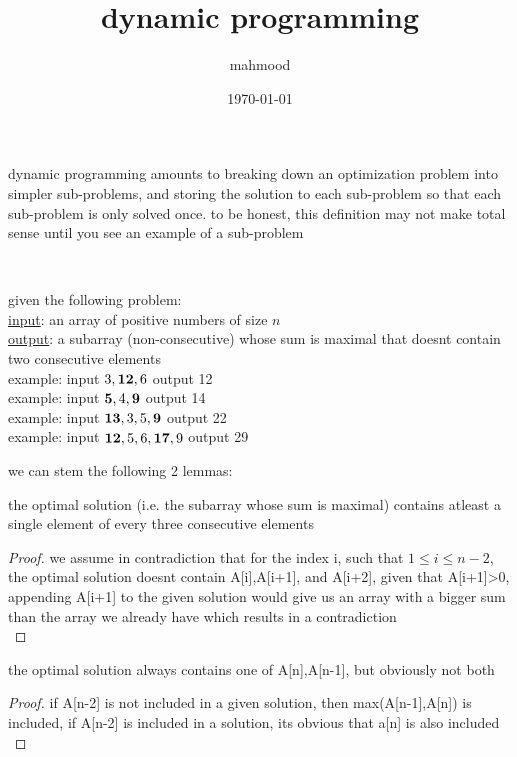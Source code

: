 \documentclass[a4paper,12pt]{article}
\author{mahmood}
\date{\today}
\title{dynamic programming}
\begin{document}
\maketitle
\begin{definition}
dynamic programming amounts to breaking down an optimization problem into simpler sub-problems, and storing the solution to each sub-problem so that each sub-problem is only solved once. to be honest, this definition may not make total sense until you see an example of a sub-problem\\[0pt]
\end{definition}
\\[0pt]
\begin{question}
given the following problem:\\[0pt]
\uline{input}: an array of positive numbers of size \(n\)\\[0pt]
\uline{output}: a subarray (non-consecutive) whose sum is maximal that doesnt contain two consecutive elements\\[0pt]
example: input \(3,{\bf 12},6\) output 12\\[0pt]
example: input \({\bf 5},4,{\bf 9}\) output 14\\[0pt]
example: input \({\bf 13},3,5,{\bf 9}\) output 22\\[0pt]
example: input \({\bf 12},5,6,{\bf 17},9\) output 29\\[0pt]
\begin{answer}
we can stem the following 2 lemmas:\\[0pt]
\begin{lemma}
the optimal solution (i.e. the subarray whose sum is maximal) contains atleast a single element of every three consecutive elements\\[0pt]
\begin{proof}
we assume in contradiction that for the index i, such that \(1 \le i \le n-2\), the optimal solution doesnt contain A[i],A[i+1], and A[i+2], given that A[i+1]>0, appending A[i+1] to the given solution would give us an array with a bigger sum than the array we already have which results in a contradiction\\[0pt]
\end{proof}
\end{lemma}
\begin{lemma}
the optimal solution always contains one of A[n],A[n-1], but obviously not both\\[0pt]
\begin{proof}
if A[n-2] is not included in a given solution, then max(A[n-1],A[n]) is included, if A[n-2] is included in a solution, its obvious that a[n] is also included\\[0pt]

\end{proof}
\end{lemma}
\end{answer}
\end{question}
\end{document}
